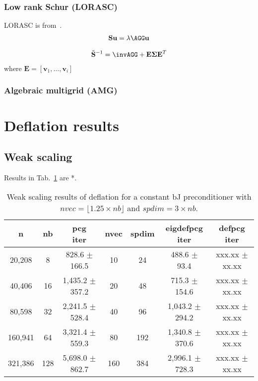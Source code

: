 \documentclass{article}
\begin{document}
\subsubsection{Low rank Schur (LORASC)}
LORASC is from~\cite{Grigori2014}.
\begin{align}
\mathbf{S}\mathbf{u}=\lambda\AGG\mathbf{u}
\end{align}

\begin{align}
\tilde{\mathbf{S}}^{-1}=\invAGG+\mathbf{E}\boldsymbol{\Sigma}\mathbf{E}^T
\end{align}
where $\mathbf{E}=[\mathbf{v}_1,\dots,\mathbf{v}_i]$

\subsubsection{Algebraic multigrid (AMG)}

\section{Deflation results}

\subsection{Weak scaling}
Results in Tab.~\ref{Tab:005} are *.





\begin{table}[ht]
	\caption{Weak scaling results of deflation for a constant bJ preconditioner with $nvec=\lfloor1.25\times nb\rfloor$ and $spdim=3\times nb$.}
	\centering
	\begin{tabular}{|c|c|c|c|c|c|c|}
		\hline
		n & nb & \makecell{pcg\\ iter} & nvec & spdim & \makecell{eigdefpcg\\ iter} & \makecell{defpcg\\ iter}\\
		\hline
		20,208  &   8 &   828.6 $\pm$ 166.5 &  10 &  24 &   488.6 $\pm$  93.4 & xxx.xx $\pm$ xx.xx \\
		40,406  &  16 & 1,435.2 $\pm$ 357.2 &  20 &  48 &   715.3 $\pm$ 154.6 & xxx.xx $\pm$ xx.xx \\
		80,598  &  32 & 2,241.5 $\pm$ 528.4 &  40 &  96 & 1,043.2 $\pm$ 294.2 & xxx.xx $\pm$ xx.xx \\
		160,941 &  64 & 3,321.4 $\pm$ 559.3 &  80 & 192 & 1,340.8 $\pm$ 370.6 & xxx.xx $\pm$ xx.xx \\
		321,386 & 128 & 5,698.0 $\pm$ 862.7 & 160 & 384 & 2,996.1 $\pm$ 728.3 & xxx.xx $\pm$ xx.xx \\
		\hline
	\end{tabular}
	\label{Tab:005}
\end{table}
\end{document}
